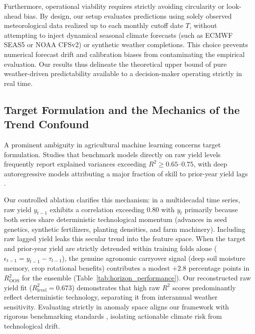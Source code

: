 Furthermore, operational viability requires strictly avoiding circularity or look-ahead bias. By design, our setup evaluates predictions using solely observed meteorological data realized up to each monthly cutoff date $T$, without attempting to inject dynamical seasonal climate forecasts (such as ECMWF SEAS5 or NOAA CFSv2) or synthetic weather completions. This choice prevents numerical forecast drift and calibration biases from contaminating the empirical evaluation. Our results thus delineate the theoretical upper bound of pure weather-driven predictability available to a decision-maker operating strictly in real time.

\subsection{Target Formulation and the Mechanics of the Trend Confound}
A prominent ambiguity in agricultural machine learning concerns target formulation. Studies that benchmark models directly on raw yield levels frequently report explained variances exceeding $R^2 \ge 0.65$--$0.75$, with deep autoregressive models attributing a major fraction of skill to prior-year yield lags \citep{ChenZhang2026}. 

Our controlled ablation clarifies this mechanism: in a multidecadal time series, raw yield $y_{t-1}$ exhibits a correlation exceeding $0.80$ with $y_t$ primarily because both series share deterministic technological momentum (advances in seed genetics, synthetic fertilizers, planting densities, and farm machinery). Including raw lagged yield leaks this secular trend into the feature space. When the target and prior-year yield are strictly detrended within training folds alone ($\epsilon_{t-1} = y_{t-1} - \hat{\tau}_{t-1}$), the genuine agronomic carryover signal (deep soil moisture memory, crop rotational benefits) contributes a modest $+2.8$ percentage points in $R^2_{\text{OOS}}$ for the ensemble (Table~\ref{tab:horizon_performance}). Our reconstructed raw yield fit ($R^2_{\text{level}} = 0.673$) demonstrates that high raw $R^2$ scores predominantly reflect deterministic technology, separating it from interannual weather sensitivity. Evaluating strictly in anomaly space aligns our framework with rigorous benchmarking standards \citep{Hoffman2020}, isolating actionable climate risk from technological drift.

